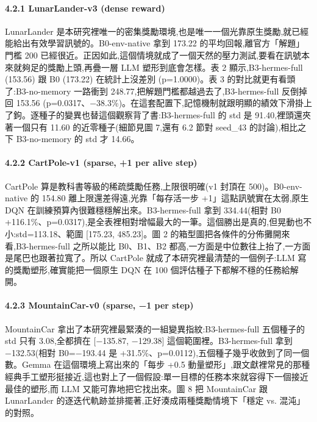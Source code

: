 \paragraph{4.2.1 LunarLander-v3 (dense reward)}\label{421-lunarlander-v3-dense-reward}

LunarLander 是本研究裡唯一的密集獎勵環境,也是唯一一個光靠原生獎勵,就已經能給出有效學習訊號的。B0-env-native 拿到 173.22 的平均回報,離官方「解題」門檻 200 已經很近。正因如此,這個情境就成了一個天然的壓力測試,要看在訊號本來就夠足的獎勵上頭,再疊一層 LLM 塑形到底會怎樣。表 2 顯示,B3-hermes-full (153.56) 跟 B0 (173.22) 在統計上沒差別 (p=1.0000)。表 3 的對比就更有看頭了:B3-no-memory 一路衝到 248.77,把解題門檻都越過去了,B3-hermes-full 反倒掉回 153.56 (p=0.0317、−38.3\%)。在這套配置下,記憶機制就跟明顯的績效下滑掛上了鉤。逐種子的變異也替這個觀察背了書:B3-hermes-full 的 std 是 91.40,裡頭還夾著一個只有 11.60 的近零種子(細節見圖 7,還有 6.2 節對 seed\_43 的討論),相比之下 B3-no-memory 的 std 才 14.66。

\paragraph{4.2.2 CartPole-v1 (sparse, +1 per alive step)}\label{422-cartpole-v1-sparse-1-per-alive-step}

CartPole 算是教科書等級的稀疏獎勵任務,上限很明確(v1 封頂在 500)。B0-env-native 的 154.80 離上限還差得遠,光靠「每存活一步 +1」這點訊號實在太弱,原生 DQN 在訓練預算內很難穩穩解出來。B3-hermes-full 拿到 334.44(相對 B0 +116.1\%、p=0.0317),是全表裡相對增幅最大的一筆。這個勝出是真的,但晃動也不小:std=113.18、範圍 {[}175.23, 485.23{]}。圖 2 的箱型圖把各條件的分佈攤開來看,B3-hermes-full 之所以能比 B0、B1、B2 都高,一方面是中位數往上抬了,一方面是尾巴也跟著拉寬了。所以 CartPole 就成了本研究裡最清楚的一個例子:LLM 寫的獎勵塑形,確實能把一個原生 DQN 在 100 個評估種子下都解不穩的任務給解開。

\paragraph{4.2.3 MountainCar-v0 (sparse, −1 per step)}\label{423-mountaincar-v0-sparse-1-per-step}

MountainCar 拿出了本研究裡最緊湊的一組變異指紋:B3-hermes-full 五個種子的 std 只有 3.08,全都擠在 {[}−135.87, −129.38{]} 這個範圍裡。B3-hermes-full 拿到 −132.53(相對 B0=−193.44 是 +31.5\%、p=0.0112),五個種子幾乎收斂到了同一個數。Gemma 在這個環境上寫出來的「每步 +0.5 動量塑形」,跟文獻裡常見的那種經典手工塑形挺接近,這也對上了一個假設:單一目標的任務本來就容得下一個接近最佳的塑形,而 LLM 又能可靠地把它找出來。圖 8 把 MountainCar 跟 LunarLander 的逐迭代軌跡並排擺著,正好湊成兩種獎勵情境下「穩定 vs. 混沌」的對照。

